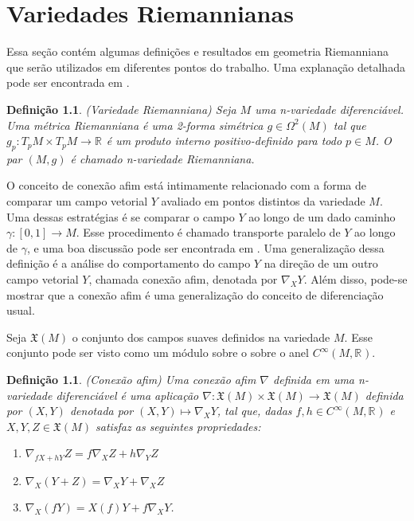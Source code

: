 \documentclass[12pt]{book}
\newtheorem{definicao}[teorema]{Definição}
\newcommand{\campossuaves}[1]{\mathfrak{X}(#1)}
\newcommand{\funcoessuaves}[1]{C^{\infty}(#1, \real{})}
\newcommand{\intervalo}{[0,1]}
\newcommand{\real}[1]{\mathbb{R}^{#1}}
\begin{document}
	\chapter{Variedades Riemannianas}\label{apendice_variedade_riemanniana}
	
	Essa seção contém algumas definições e resultados em geometria Riemanniana que serão utilizados em diferentes pontos do trabalho. Uma explanação detalhada pode ser encontrada em \cite{manfredo_riemannian_geo}.
	
	\begin{definicao}\label{definicao_variedade_riemanniana}
		(Variedade Riemanniana) Seja $M$ uma n-variedade diferenciável. Uma métrica Riemanniana é uma 2-forma simétrica $g \in \Omega^{2}(M)$ tal que $g_{p}:T_{p}M \times T_{p}M \to \real{}$ é um produto interno positivo-definido para todo $p \in M$. O par $(M, g)$ é chamado n-variedade Riemanniana.
	\end{definicao}
	
	O conceito de conexão afim está intimamente relacionado com a forma de comparar um campo vetorial $Y$ avaliado em pontos distintos da variedade $M$. Uma dessas estratégias é se comparar o campo $Y$ ao longo de um dado caminho $\gamma:\intervalo \to M$. Esse procedimento é chamado transporte paralelo de $Y$ ao longo de $\gamma$, e uma boa discussão pode ser encontrada em \cite{nakahara}. Uma generalização dessa definição é a análise do comportamento do campo $Y$ na direção de um outro campo vetorial $Y$, chamada conexão afim, denotada por $\nabla_{X}Y$. Além disso, pode-se mostrar que a conexão afim é uma generalização do conceito de diferenciação usual.


	Seja $\campossuaves{M}$ o conjunto dos campos suaves definidos na variedade $M$. Esse conjunto pode ser visto como um módulo sobre o sobre o anel $\funcoessuaves{M}$.
	
	\begin{definicao}\label{definicao_conexao_afim}
		(Conexão afim) Uma conexão afim $\nabla$ definida em uma n-variedade diferenciável é uma aplicação $\nabla: \campossuaves{M} \times \campossuaves{M} \to \campossuaves{M}$ definida por $(X,Y)$ denotada por $(X,Y)\mapsto \nabla_{X}Y$, tal que, dadas $f,h \in \funcoessuaves{M}$ e $X,Y,Z \in \campossuaves{M}$ satisfaz as seguintes propriedades:
		\begin{enumerate}
			\item $\nabla_{fX+hY}Z = f\nabla_{X}Z+h\nabla_{Y}Z$
			\item $\nabla_{X}(Y+Z) = \nabla_{X}Y+ \nabla_{X}Z$
			\item $\nabla_{X}(fY) = X(f)Y+f\nabla_{X}Y$.
		\end{enumerate}
	\end{definicao}
	
\end{document}
